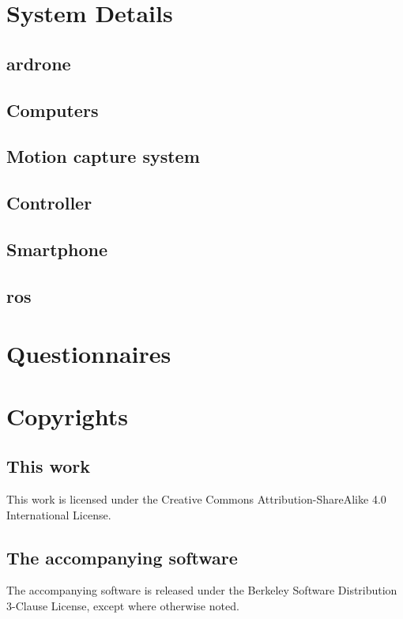 \appendix
\chapter{System Details}
\section{\gls{ardrone}}
\section{Computers}  %
\section{Motion capture system}
\section{Controller}
\section{Smartphone}
\section{\gls{ros}}  %

\chapter{Questionnaires}

\chapter{Copyrights}
\section{This work}
This work is licensed under the Creative Commons Attribution-ShareAlike 4.0 International License.
\section{The accompanying software}
The accompanying software is released under the Berkeley Software Distribution 3-Clause License, except where otherwise noted. 
